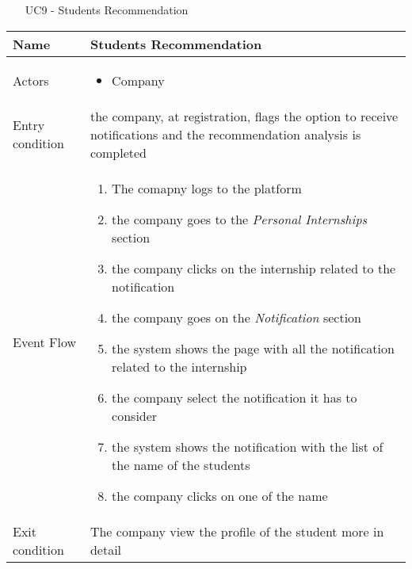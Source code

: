 				\begin{table} [H]
					\centering
					\begin{itemize}
						\item [UC9] - Students Recommendation
					\end{itemize}
					\begin{tabular}{|| P{7.5cm} | P{7.5cm} ||}
						\hline
						Name & Students Recommendation \\
						\hline
						Actors & \parbox{5cm}{\begin{itemize}
								\item Company
							\end{itemize}
						} \\
						\hline
						Entry condition & the company, at registration, flags the 
						option to receive notifications and the recommendation analysis is completed\\
						\hline
						Event Flow & \parbox{5cm}{\begin{enumerate}[label=\alpha]
								\item The comapny logs to the platform  
								\item the company goes to the \textit{Personal Internships} 
								section
								\item  the company clicks on the internship related to the notification
								\item the company goes on the \textit{Notification} section 
								\item the system shows the page with all the notification related to the internship
								\item the company select the notification it has to consider
								\item the system shows the notification with the list of the name of the students
								\item the company clicks on one of the name
						\end{enumerate}} \\
						\hline 
						Exit condition & The company view the profile of the student more in 
						detail \\
						\hline
					\end{tabular}
				\end{table}
				
				
			
